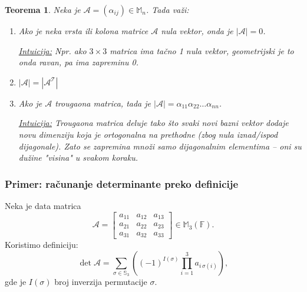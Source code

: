 \documentclass[a4paper,12pt,twoside]{report}
\newtheorem{theorem}{Teorema}[section]
\numberwithin{algorithm}{section}
\begin{document}
\begin{figure}[!h]
    \end{figure}
    \newpage

\begin{theorem}
    Neka je $\mathcal{A} = (\alpha_{ij}) \in \mathbb{M}_n$. Tada važi:
    \begin{enumerate}
        \item Ako je neka vrsta ili kolona matrice $\mathcal{A}$ nula vektor, onda je $|\mathcal{A}| = 0$.
    
        \noindent\underline{\textit{Intuicija:}} Npr. ako $3\times 3$ matrica ima tačno 1 nula vektor, geometrijski je to onda ravan, pa ima zapreminu 0.
        \item $|\mathcal{A}| = |\mathcal{A^T}|$
        \item Ako je $\mathcal{A}$ trougaona matrica, tada je $|\mathcal{A}| = \alpha_{11}\alpha_{22}\dots \alpha_{nn}$.
        
        \noindent\underline{\textit{Intuicija:}} Trougaona matrica deluje tako što svaki novi bazni vektor dodaje novu dimenziju koja je ortogonalna na prethodne (zbog nula iznad/ispod dijagonale). Zato se zapremina množi samo dijagonalnim elementima – oni su dužine "visina" u svakom koraku.
    \end{enumerate} 
\end{theorem}

\subsubsection*{Primer: računanje determinante preko definicije}
Neka je data matrica 
\[
\mathcal{A} = \begin{bmatrix}
a_{11} & a_{12} & a_{13} \\
a_{21} & a_{22} & a_{23} \\
a_{31} & a_{32} & a_{33}
\end{bmatrix} \in \mathbb{M}_3(\mathbb{F}).
\]
Koristimo definiciju:
\[
\det \mathcal{A} = \sum_{\sigma \in \mathbb{S}_3} \left( (-1)^{I(\sigma)} \prod_{i=1}^{3} a_{i \, \sigma(i)} \right),
\]
gde je \( I(\sigma) \) broj inverzija permutacije \( \sigma \).
\medskip
\end{document}
